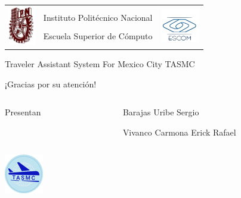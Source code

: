 \documentclass[12pt]{beamer}
\begin{document}
\begin{frame}
	\begin{center}
	\begin{minipage}[t]{0.73\textwidth}	
		\begin{tabular}{ccc}
			\multirow{4}{*}{\includegraphics[height=1.7cm]{imagenes/ipn.png}} &
			&
     	 	\multirow{4}{*}{\includegraphics[height=1.5cm]{imagenes/escom.png}} \\
      		& Instituto Politécnico Nacional & \\
      		& Escuela Superior de Cómputo & \\
      		&&\\
		\end{tabular}
	\end{minipage}
	\end{center}
	
	\begin{center}
		\textcolor[RGB]{0,0,204}{\Large Traveler Assistant System For Mexico City TASMC}
	\end{center}		
	
	\begin{center}
		\Large ¡Gracias por su atención!
	\end{center}
	
	\begin{columns} 
		\begin{column}{0.1cm}
			Presentan
		\end{column}
		\begin{column}{6cm} 
			Barajas Uribe Sergio

			Vivanco Carmona Erick Rafael
		\end{column} 
	\end{columns}	
	
		\begin{center}
		\includegraphics[height=1.7cm]{imagenes/logo.png}
	\end{center}		
\end{frame}
	
\end{document}
